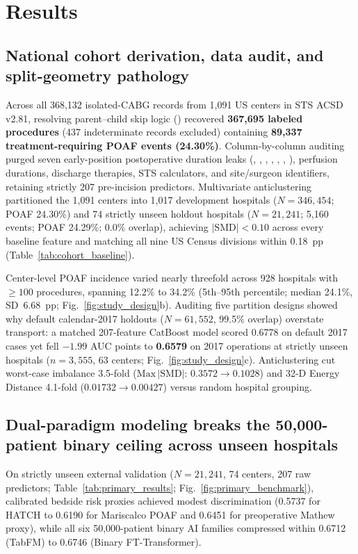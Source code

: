\section{Results}
\label{sec:results}

\subsection{National cohort derivation, data audit, and split-geometry pathology}
Across all 368,132 isolated-CABG records from 1,091 US centers in STS ACSD v2.81, resolving parent--child skip logic () recovered \textbf{367,695 labeled procedures} (437 indeterminate records excluded) containing \textbf{89,337 treatment-requiring POAF events (24.30\%)}. Column-by-column auditing purged seven early-position postoperative duration leaks (, , , , , , ), perfusion durations, discharge therapies, STS calculators, and site/surgeon identifiers, retaining strictly 207 pre-incision predictors. Multivariate anticlustering partitioned the 1,091 centers into 1,017 development hospitals ($N=346{,}454$; POAF 24.30\%) and 74 strictly unseen holdout hospitals ($N=21{,}241$; 5,160 events; POAF 24.29\%; 0.0\% overlap), achieving $|\mathrm{SMD}| < 0.10$ across every baseline feature and matching all nine US Census divisions within 0.18~pp (Table~\ref{tab:cohort_baseline}).



Center-level POAF incidence varied nearly threefold across 928 hospitals with $\ge 100$ procedures, spanning 12.2\% to 34.2\% (5th--95th percentile; median 24.1\%, SD~6.68~pp; Fig.~\ref{fig:study_design}b). Auditing five partition designs showed why default calendar-2017 holdouts ($N=61{,}552$, 99.5\% overlap) overstate transport: a matched 207-feature CatBoost model scored 0.6778 on default 2017 cases yet fell $-1.99$ AUC points to \textbf{0.6579} on 2017 operations at strictly unseen hospitals ($n=3{,}555$, 63 centers; Fig.~\ref{fig:study_design}c). Anticlustering cut worst-case imbalance 3.5-fold ($\mathrm{Max}\,|\mathrm{SMD}|$: $0.3572 \to 0.1028$) and 32-D Energy Distance 4.1-fold ($0.01732 \to 0.00427$) versus random hospital grouping.

\subsection{Dual-paradigm modeling breaks the 50,000-patient binary ceiling across unseen hospitals}
On strictly unseen external validation ($N=21{,}241$, 74 centers, 207 raw predictors; Table~\ref{tab:primary_results}; Fig.~\ref{fig:primary_benchmark}), calibrated bedside risk proxies achieved modest discrimination (0.5737 for HATCH to 0.6190 for Mariscalco POAF and 0.6451 for preoperative Mathew proxy), while all six 50,000-patient binary AI families compressed within 0.6712 (TabFM) to 0.6746 (Binary FT-Transformer).

